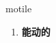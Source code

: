 
\begin{frame}
{\huge motile}
\begin{center}
\begin{enumerate}\Large
  \item \textbf{能动的}
\end{enumerate}
\end{center}
\end{frame}
